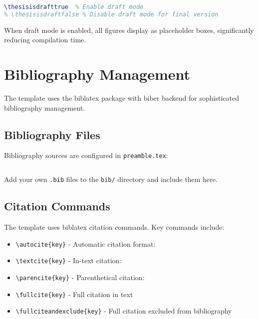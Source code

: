 \begin{lstlisting}[language=TeX,caption={Draft mode toggle in thesis.tex}]
% Toggle draft mode - figures show as placeholder boxes
\thesisisdrafttrue  % Enable draft mode
% \thesisisdraftfalse % Disable draft mode for final version
\end{lstlisting}

When draft mode is enabled, all figures display as placeholder boxes, significantly reducing compilation time.

\section{Bibliography Management}
\label{sect:bibliography}

The template uses the biblatex package with biber backend for sophisticated bibliography management.

\subsection{Bibliography Files}
\label{sect:bib-files}

Bibliography sources are configured in \texttt{preamble.tex}:

\begin{lstlisting}[language=TeX,caption={Bibliography configuration}]


\end{lstlisting}

Add your own \texttt{.bib} files to the \texttt{bib/} directory and include them here.

\subsection{Citation Commands}
\label{sect:citations}

The template uses biblatex citation commands. Key commands include:

\begin{itemize}
    \item \texttt{\textbackslash autocite\{key\}} - Automatic citation format: \autocite{yourname2024nature}
    \item \texttt{\textbackslash textcite\{key\}} - In-text citation: \textcite{yourname2024nature}
    \item \texttt{\textbackslash parencite\{key\}} - Parenthetical citation: \parencite{yourname2024nature}
    \item \texttt{\textbackslash fullcite\{key\}} - Full citation in text
    \item \texttt{\textbackslash fullciteandexclude\{key\}} - Full citation excluded from bibliography
\end{itemize}

